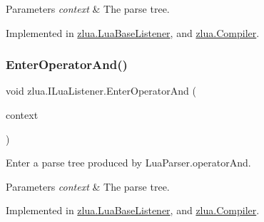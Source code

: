 \begin{DoxyParams}{Parameters}
{\em context} & The parse tree.\\
\hline
\end{DoxyParams}


Implemented in \mbox{\hyperlink{classzlua_1_1_lua_base_listener_ac3bb5e4809651278e44d46bc5ca3c7b1}{zlua.\+Lua\+Base\+Listener}}, and \mbox{\hyperlink{classzlua_1_1_compiler_ad766e6d486cd81a33eca68f94ed7fb79}{zlua.\+Compiler}}.

\mbox{\label{interfacezlua_1_1_i_lua_listener_aa0c0270aabb19cc89bce3c5823a2f012}} 
\subsubsection{\texorpdfstring{Enter\+Operator\+And()}{EnterOperatorAnd()}}
{\footnotesize\ttfamily void zlua.\+I\+Lua\+Listener.\+Enter\+Operator\+And (\begin{DoxyParamCaption}\item[{\mbox{[}\+Not\+Null\mbox{]} \mbox{\hyperlink{classzlua_1_1_lua_parser_1_1_operator_and_context}{Lua\+Parser.\+Operator\+And\+Context}}}]{context }\end{DoxyParamCaption})}



Enter a parse tree produced by Lua\+Parser.\+operator\+And. 


\begin{DoxyParams}{Parameters}
{\em context} & The parse tree.\\
\hline
\end{DoxyParams}


Implemented in \mbox{\hyperlink{classzlua_1_1_lua_base_listener_a78b389b5400066d8a9171b86b1529cf7}{zlua.\+Lua\+Base\+Listener}}, and \mbox{\hyperlink{classzlua_1_1_compiler_a028404702602498261a23021b36b5a87}{zlua.\+Compiler}}.

\mbox{\label{interfacezlua_1_1_i_lua_listener_a0117059ce449d21ba61dc80748edaa15}} 
